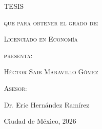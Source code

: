 \documentclass[letterpaper,12pt,oneside]{book}
\begin{document}
\begin{titlepage}
\begin{minipage}[t][0.78\textheight][t]{0.74\textwidth}
			{\LARGE\scshape
				T\hspace{1cm}E\hspace{1cm}S\hspace{1cm}I\hspace{1cm}S
				\par}
			
			\vspace{0.5cm}
			
			{\large\scshape que para obtener el grado de:\par}
			
			\vspace{0.5cm}
			
			{\large\scshape Licenciado en Econom\'ia\par}
			
			\vspace{0.5cm}
			
			{\large\scshape presenta:\par}
			
			\vspace{0.5cm}
			
			{\large\scshape H\'ector Saib Maravillo G\'omez\par}
			
			\vspace{1.5cm}
			
			{\large\scshape
				Asesor:\par
				\vspace{0.3cm}
				Dr. Eric Hern\'andez Ram\'irez
				\par}
			
			\vfill
			
			{\large Ciudad de M\'exico, 2026\par}
			
			\vspace{0.5cm}
		\end{minipage}
		
	\end{titlepage}
		
	
	
	
\end{document}

